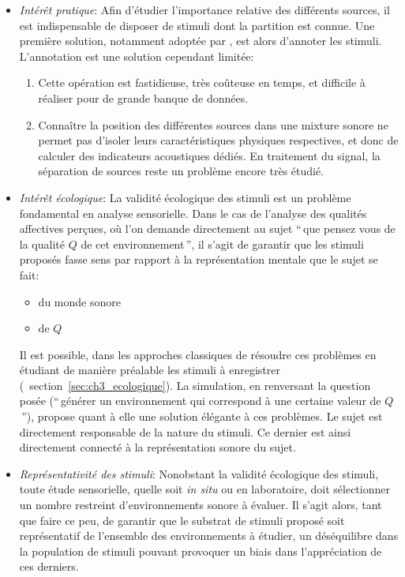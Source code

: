 \begin{itemize}
\item \emph{Intérêt pratique}: Afin d'étudier l'importance relative des différents sources, il est indispensable de disposer de stimuli dont la partition est connue. Une première solution, notamment adoptée par \citep{lavandier2006contribution}, est alors d'annoter les stimuli. L'annotation est une solution cependant limitée: 
\begin{enumerate}
\item Cette opération est fastidieuse, très coûteuse en temps, et difficile à réaliser pour de grande banque de données.
\item Connaître la position des différentes sources dans une mixture sonore ne permet pas  d'isoler leurs caractéristiques physiques respectives, et donc de calculer des indicateurs acoustiques dédiés. En traitement du signal, la séparation de sources reste un problème encore très étudié.
\end{enumerate}
\item \emph{Intérêt écologique}: La validité écologique des stimuli est un problème fondamental en analyse sensorielle. Dans le cas de l'analyse des qualités affectives perçues, où l'on demande directement au sujet ``\,que pensez vous de la qualité $Q$ de cet environnement\,'', il s'agit de garantir que les stimuli proposés  fasse sens par rapport à la représentation mentale que le sujet se fait:
\begin{itemize}
\item  du monde sonore 
\item  de $Q$ 
\end{itemize}
Il est possible, dans les approches classiques de résoudre ces problèmes en étudiant de manière préalable les stimuli à enregistrer (\cf~section~\ref{sec:ch3_ecologique}). La simulation, en renversant la question posée (``\,générer un environnement qui correspond à une certaine valeur de $Q$ \,''), propose quant à elle une solution élégante à ces problèmes. Le sujet est directement responsable de la nature du stimuli. Ce dernier est ainsi directement connecté à la représentation sonore du sujet.

\item \emph{Représentativité des stimuli}: Nonobstant la validité écologique des stimuli, toute étude sensorielle, quelle soit \emph{in situ} ou en laboratoire, doit sélectionner un nombre restreint d'environnements sonore à évaluer. Il s'agit alors, tant que faire ce peu, de garantir que le substrat de stimuli proposé soit représentatif de l'ensemble des environnements à étudier, un déséquilibre dans la population de stimuli  pouvant provoquer un biais dans l'appréciation de ces derniers. 


\end{itemize}
